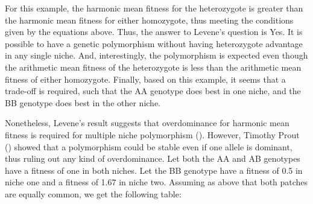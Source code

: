 \documentclass[
  letterpaper,
]{book}
\begin{document}
For this example, the harmonic mean fitness for the heterozygote is
greater than the harmonic mean fitness for either homozygote, thus
meeting the conditions given by the equations above. Thus, the answer to
Levene's question is Yes. It is possible to have a genetic polymorphism
without having heterozygote advantage in any single niche. And,
interestingly, the polymorphism is expected even though the arithmetic
mean fitness of the heterozygote is less than the arithmetic mean
fitness of either homozygote. Finally, based on this example, it seems
that a trade-off is required, such that the AA genotype does best in one
niche, and the BB genotype does best in the other niche.

Nonetheless, Levene's result suggests that overdominance for harmonic
mean fitness is required for multiple niche polymorphism
(). However, Timothy Prout
() showed that a polymorphism could be
stable even if one allele is dominant, thus ruling out any kind of
overdominance. Let both the AA and AB genotypes have a fitness of one in
both niches. Let the BB genotype have a fitness of 0.5 in niche one and
a fitness of 1.67 in niche two. Assuming as above that both patches are
equally common, we get the following table:
\end{document}
